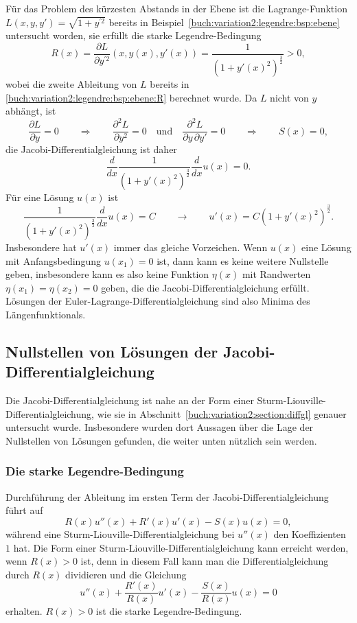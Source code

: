 \begin{beispiel}
Für das Problem des kürzesten Abstands in der Ebene ist
die Lagrange-Funktion $L(x,y,y')=\sqrt{1+y^{\prime 2}}$ bereits
in Beispiel~\ref{buch:variation2:legendre:bsp:ebene}
untersucht worden, sie erfüllt die starke Legendre-Bedingung
\[
R(x)
=
\frac{\partial L}{\partial y^{\prime 2}}(x,y(x),y'(x))
=
\frac{1}{(1+y'(x)^2)^{\frac32}} > 0,
\]
wobei die zweite Ableitung von $L$ bereits in
\eqref{buch:variation2:legendre:bsp:ebene:R}
berechnet wurde.
Da $L$ nicht von $y$ abhängt, ist
\[
\frac{\partial L}{\partial y}=0
\qquad\Rightarrow\qquad
\frac{\partial^2L}{\partial y^2}=0
\quad\text{und}\quad
\frac{\partial^2L}{\partial y\,\partial y'}=0
\qquad\Rightarrow\qquad
S(x)=0,
\]
die Jacobi-Differentialgleichung ist daher
\begin{equation}
\frac{d}{dx} \frac{1}{(1+y'(x)^2)^{\frac32}} \frac{d}{dx} u(x) = 0.
\label{buch:variation2:jacobi:eqn:ebeneQ}
\end{equation}
Für eine Lösung $u(x)$ ist
\[
\frac{1}{(1+y'(x)^2)^{\frac32}}
\frac{d}{dx} u(x) = C
\qquad\rightarrow\qquad
u'(x)
=
C(1+y'(x)^2)^{\frac32}.
\]
Insbesondere hat $u'(x)$ immer das gleiche Vorzeichen.
Wenn $u(x)$ eine Lösung mit Anfangsbedingung $u(x_1)=0$ ist, dann
kann es keine weitere Nullstelle geben, insbesondere kann es
also keine Funktion $\eta(x)$ mit Randwerten $\eta(x_1)=\eta(x_2)=0$
geben, die die Jacobi-Differentialgleichung erfüllt.
Lösungen der Euler-Lagrange-Differentialgleichung sind also Minima
des Längenfunktionals.
\end{beispiel}

%
%
\subsection{Nullstellen von Lösungen der Jacobi-Differentialgleichung
\label{buch:variation2:jacobi:subection:nullstellen}}
Die Jacobi-Differentialgleichung ist nahe an der Form einer
Sturm-Liouville-Differential\-gleichung,
wie sie in Abschnitt~\ref{buch:variation2:section:diffgl} genauer
untersucht wurde.
Insbesondere wurden dort Aussagen über die Lage der Nullstellen von
Lösungen gefunden, die weiter unten nützlich sein werden.

%
%
\subsubsection{Die starke Legendre-Bedingung}
Durchführung der Ableitung im ersten Term der Jacobi-Differentialgleichung
führt auf
\[
R(x) u''(x) + R'(x) u'(x) - S(x) u(x) = 0,
\]
während eine Sturm-Liouville-Differentialgleichung bei $u''(x)$ den
Koeffizienten $1$ hat.
Die Form einer Sturm-Liouville-Differentialgleichung kann erreicht
werden, wenn $R(x)>0$ ist, denn in diesem Fall kann man die
Differentialgleichung durch $R(x)$ dividieren und die Gleichung
\[
u''(x) + \frac{R'(x)}{R(x)} u'(x) -\frac{S(x)}{R(x)} u(x) = 0
\]
erhalten.
$R(x)>0$ ist die starke Legendre-Bedingung.

